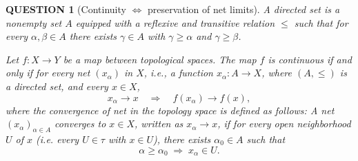 \documentclass[12pt]{article}
\renewcommand{\(}{\left(}%
\renewcommand{\)}{\right)}%
\renewcommand{\[}{\left[}%
\renewcommand{\]}{\right]}%
\newtheorem{question}{QUESTION}[section]}
\begin{document}
  \begin{question}[Continuity $\Leftrightarrow$ preservation of net limits]
	A \emph{directed set} is a nonempty set $A$ equipped with a reflexive and transitive relation $\le$ such that for every $\alpha,\beta\in A$ there exists $\gamma\in A$ with $\gamma \ge \alpha$ and $\gamma \ge \beta$. 
	
	Let $f:X\to Y$ be a map between topological spaces. The map $f$ is continuous if and only if for every net $(x_\alpha)$ in $X$, i.e., a function $x_\alpha : A \to X$, where $(A,\le)$ is a directed set,  and every $x\in X$,
\begin{equation*}
x_\alpha \to x \quad\Rightarrow\quad f(x_\alpha)\to f(x),
\end{equation*}
where the convergence of net in the topology space is defined as follows: A net $(x_\alpha)_{\alpha\in A}$ converges to $x\in X$, written as $x_\alpha \to x$,
if for every open neighborhood $U$ of $x$ (i.e. every $U\in\tau$ with $x\in U$), there exists $\alpha_0\in A$ such that 
\begin{equation*}
\alpha \ge \alpha_0 \;\Rightarrow\; x_\alpha \in U.
\end{equation*}
\end{question}
\end{document}
